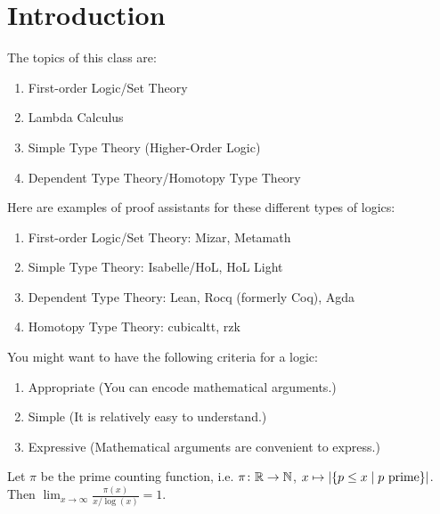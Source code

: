 \section{Introduction}

The topics of this class are: 
\begin{enumerate}
    \item First-order Logic/Set Theory
    \item Lambda Calculus
    \item Simple Type Theory (Higher-Order Logic)
    \item Dependent Type Theory/Homotopy Type Theory
\end{enumerate}

\begin{example}
    Here are examples of proof assistants for these different types of logics: 
    \begin{enumerate}
        \item First-order Logic/Set Theory: Mizar, Metamath
        \item Simple Type Theory: Isabelle/HoL, HoL Light
        \item Dependent Type Theory: Lean, Rocq (formerly Coq), Agda
        \item Homotopy Type Theory: cubicaltt, rzk
    \end{enumerate}
\end{example}

\begin{rem}
    You might want to have the following criteria for a logic: 
    \begin{enumerate}
        \item Appropriate (You can encode mathematical arguments.)
        \item Simple (It is relatively easy to understand.)
        \item Expressive (Mathematical arguments are convenient to express.)
    \end{enumerate}
\end{rem}

\begin{thm}
Let $\pi$ be the prime counting function, i.e. $\pi \colon \mathbb{R} \to \mathbb{N}$, $x \mapsto \lvert \{ p \le x \mid p \text{\textup{ prime}} \} \rvert$.
    Then $\lim_{x \to \infty} \frac{\pi (x)}{x / \log(x)} = 1$.
\end{thm}

